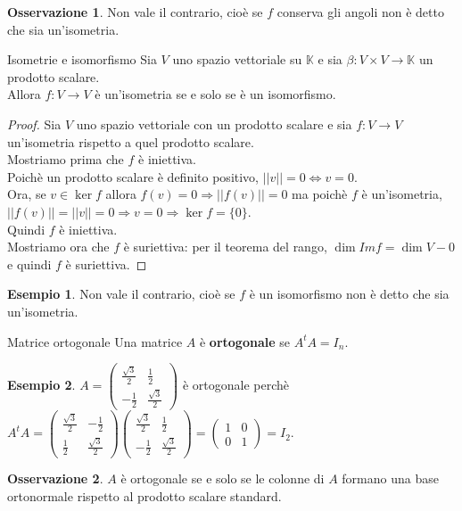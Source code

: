 \documentclass[a4paper]{article}
\theoremstyle{definition}
\newtheorem*{oss}{Osservazione}
\newtheorem*{es}{Esempio}
\begin{document}
	\begin{oss}
		Non vale il contrario, cioè se $f$ conserva gli angoli non è detto che sia un'isometria.
	\end{oss}

	\begin{teo}{Isometrie e isomorfismo}{}
		Sia $V$ uno spazio vettoriale su $\mathbb{K}$ e sia $\beta: V \times V \to \mathbb{K}$ un prodotto scalare. \\
		Allora $f: V \to V$ è un'isometria se e solo se è un isomorfismo.
	\end{teo}
	\begin{proof}
		Sia $V$ uno spazio vettoriale con un prodotto scalare e sia $f: V \to V$ un'isometria rispetto a quel prodotto scalare. \\
		Mostriamo prima che $f$ è iniettiva. \\
		Poichè un prodotto scalare è definito positivo, $||v|| = 0 \Leftrightarrow v = 0$. \\
		Ora, se $v \in \ker f$ allora $f(v) = 0 \Rightarrow ||f(v)|| = 0$ ma poichè $f$ è un'isometria, $||f(v)|| = ||v|| = 0 \Rightarrow v = 0 \Rightarrow \ker f = \{0\}$. \\
		Quindi $f$ è iniettiva. \\
		Mostriamo ora che $f$ è suriettiva: per il teorema del rango, $\dim Im f = \dim V - 0$ e quindi $f$ è suriettiva.
	\end{proof}
	\begin{es}
		Non vale il contrario, cioè se $f$ è un isomorfismo non è detto che sia un'isometria.
	\end{es}

	\begin{deff}{Matrice ortogonale}{}
		Una matrice $A$ è \textbf{ortogonale} se $A^tA = I_n$.
	\end{deff}

	\begin{es}
		$A = \begin{pmatrix}
			\frac{\sqrt{3}}{2} & \frac{1}{2} \\
			-\frac{1}{2} & \frac{\sqrt{3}}{2}
		\end{pmatrix}$ è ortogonale perchè $A^tA = \begin{pmatrix}
			\frac{\sqrt{3}}{2} & -\frac{1}{2} \\
			\frac{1}{2} & \frac{\sqrt{3}}{2}
		\end{pmatrix} \begin{pmatrix}
			\frac{\sqrt{3}}{2} & \frac{1}{2} \\
			-\frac{1}{2} & \frac{\sqrt{3}}{2}
		\end{pmatrix} = \begin{pmatrix}
			1 & 0 \\
			0 & 1
		\end{pmatrix} = I_2$.
	\end{es}
	\begin{oss}
		$A$ è ortogonale se e solo se le colonne di $A$ formano una base ortonormale rispetto al prodotto scalare standard.
	\end{oss}
\end{document}
